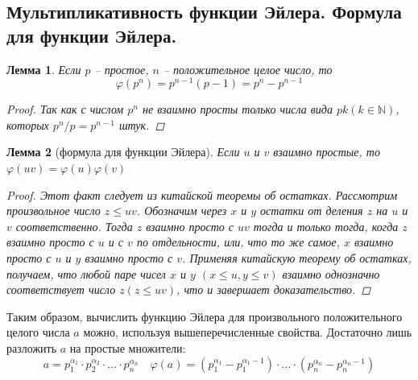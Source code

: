 \documentclass{article}
\newtheorem{lemma}{Лемма}
\begin{document}
\subsection{Мультипликативность функции Эйлера. Формула для функции Эйлера.}
\begin{lemma}
Если $p$ -- простое, $n$ -- положительное целое число, то 
\[
\varphi(p^n) = p^{n-1}(p - 1) = p^n - p^{n-1}
\]
\begin{proof}
Так как с числом $p^n$ не взаимно просты только числа вида $pk (k \in \mathbb{N})$, которых $p^n/p = p^{n-1}$ штук.
\end{proof}
\end{lemma}
\begin{lemma}[формула для функции Эйлера]
Если $u$ и $v$ взаимно простые, то $\varphi(uv) = \varphi(u)\varphi(v)$
\begin{proof}
Этот факт следует из китайской теоремы об остатках. Рассмотрим произвольное число $z \leqslant uv$. Обозначим через $x$ и $y$ остатки от деления $z$ на $u$ и $v$ соответственно. Тогда $z$ взаимно просто с $uv$ тогда и только тогда, когда $z$ взаимно просто с $u$ и с $v$ по отдельности, или, что то же самое, $x$ взаимно просто с $u$ и $y$ взаимно просто с $v$. Применяя китайскую теорему об остатках, получаем, что любой паре чисел $x$ и $y$ $(x \leqslant u, y \leqslant v)$ взаимно однозначно соответствует число $z (z \leqslant uv)$, что и завершает доказательство.
\end{proof}
\end{lemma}
Таким образом, вычислить функцию Эйлера для произвольного положительного целого числа $a$ можно, используя вышеперечисленные свойства. Достаточно лишь разложить $a$ на простые множители:
\[
a = p_1^{\alpha_1} \cdot p_2^{\alpha_2} \cdot ... \cdot p_n^{\alpha_n}
\quad
\varphi(a) = (p_1^{\alpha_1} - p_1^{\alpha_1 - 1}) \cdot ... \cdot (p_n^{\alpha_n} - p_n^{\alpha_n - 1})
\]
\end{document}
